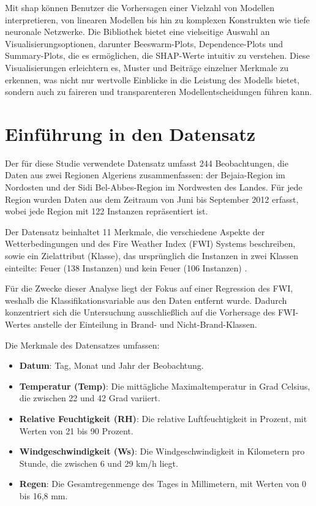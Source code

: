 Mit \textsf{shap} können Benutzer die Vorhersagen einer Vielzahl von Modellen interpretieren, 
von linearen Modellen bis hin zu komplexen Konstrukten wie tiefe neuronale Netzwerke. 
Die Bibliothek bietet eine vielseitige Auswahl an Visualisierungsoptionen, darunter Beeswarm-Plots, Dependence-Plots und 
Summary-Plots, die es ermöglichen, die SHAP-Werte intuitiv zu verstehen.
Diese Visualisierungen erleichtern es, Muster und Beiträge einzelner Merkmale zu erkennen, 
was nicht nur wertvolle Einblicke in die Leistung des Modells bietet, sondern auch zu faireren und transparenteren 
Modellentscheidungen führen kann. 

\section{Einführung in den Datensatz}

Der für diese Studie verwendete Datensatz umfasst 244 Beobachtungen, die Daten aus zwei Regionen Algeriens zusammenfassen: 
der Bejaia-Region im Nordosten und der Sidi Bel-Abbes-Region im Nordwesten des Landes. 
Für jede Region wurden Daten aus dem Zeitraum von Juni bis September 2012 erfasst, 
wobei jede Region mit 122 Instanzen repräsentiert ist.

Der Datensatz beinhaltet 11 Merkmale, die verschiedene Aspekte der Wetterbedingungen und 
des Fire Weather Index (FWI) Systems beschreiben, sowie ein Zielattribut (Klasse), 
das ursprünglich die Instanzen in zwei Klassen einteilte: Feuer (138 Instanzen) und kein 
Feuer (106 Instanzen) \cite{misc_algerian_forest_fires_dataset___547}. 

Für die Zwecke dieser Analyse liegt der Fokus auf einer Regression des FWI, 
weshalb die Klassifikationsvariable aus den Daten entfernt wurde. Dadurch konzentriert sich die Untersuchung 
ausschließlich auf die Vorhersage des FWI-Wertes anstelle der Einteilung in Brand- und Nicht-Brand-Klassen.

Die Merkmale des Datensatzes umfassen:

\begin{itemize}
    \item \textbf{Datum}: Tag, Monat und Jahr der Beobachtung.
    \item \textbf{Temperatur (Temp)}: Die mittägliche Maximaltemperatur in Grad Celsius, die zwischen 22 und 42 Grad variiert.
    \item \textbf{Relative Feuchtigkeit (RH)}: Die relative Luftfeuchtigkeit in Prozent, mit Werten von 21 bis 90 Prozent.
    \item \textbf{Windgeschwindigkeit (Ws)}: Die Windgeschwindigkeit in Kilometern pro Stunde, die zwischen 6 und 29 km/h liegt.
    \item \textbf{Regen}: Die Gesamtregenmenge des Tages in Millimetern, mit Werten von 0 bis 16,8 mm.
\end{itemize}

